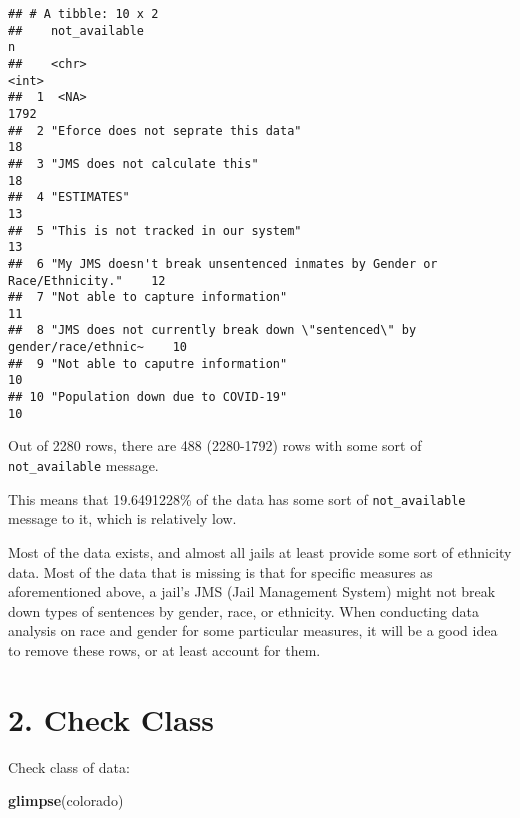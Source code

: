 \documentclass[
]{article}
\newenvironment{Shaded}{\begin{snugshade}}{\end{snugshade}}
\newcommand{\KeywordTok}[1]{\textcolor[rgb]{0.13,0.29,0.53}{\textbf{#1}}}
\newcommand{\NormalTok}[1]{#1}
\begin{document}
\begin{verbatim}
## # A tibble: 10 x 2
##    not_available                                                               n
##    <chr>                                                                   <int>
##  1  <NA>                                                                    1792
##  2 "Eforce does not seprate this data"                                        18
##  3 "JMS does not calculate this"                                              18
##  4 "ESTIMATES"                                                                13
##  5 "This is not tracked in our system"                                        13
##  6 "My JMS doesn't break unsentenced inmates by Gender or Race/Ethnicity."    12
##  7 "Not able to capture information"                                          11
##  8 "JMS does not currently break down \"sentenced\" by gender/race/ethnic~    10
##  9 "Not able to caputre information"                                          10
## 10 "Population down due to COVID-19"                                          10
\end{verbatim}

Out of 2280 rows, there are 488 (2280-1792) rows with some sort of
\texttt{not\_available} message.

This means that 19.6491228\% of the data has some sort of
\texttt{not\_available} message to it, which is relatively low.

Most of the data exists, and almost all jails at least provide some sort
of ethnicity data. Most of the data that is missing is that for specific
measures as aforementioned above, a jail's JMS (Jail Management System)
might not break down types of sentences by gender, race, or ethnicity.
When conducting data analysis on race and gender for some particular
measures, it will be a good idea to remove these rows, or at least
account for them.

\hypertarget{check-class}{%
\section{2. Check Class}\label{check-class}}

Check class of data:

\begin{Shaded}
\begin{Highlighting}[]
\KeywordTok{glimpse}\NormalTok{(colorado)}
\end{Highlighting}
\end{Shaded}
\end{document}

